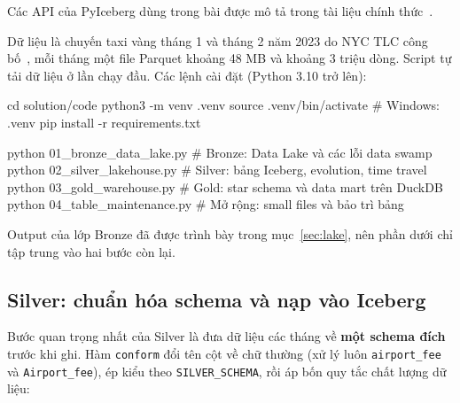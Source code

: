 \documentclass[12pt]{article}
\begin{document}
Các API của PyIceberg dùng trong bài được mô tả trong tài liệu chính thức~\cite{pyiceberg2026docs}.

Dữ liệu là chuyến taxi vàng tháng 1 và tháng 2 năm 2023 do NYC TLC công bố~\cite{tlc2026data}, mỗi tháng một file Parquet khoảng 48 MB và khoảng 3 triệu dòng. Script tự tải dữ liệu ở lần chạy đầu. Các lệnh cài đặt (Python 3.10 trở lên):

\begin{aivncodebox}
\begin{python}[language=bash]
cd solution/code
python3 -m venv .venv
source .venv/bin/activate          # Windows: .venv\Scripts\activate
pip install -r requirements.txt

python 01_bronze_data_lake.py      # Bronze: Data Lake và các lỗi data swamp
python 02_silver_lakehouse.py      # Silver: bảng Iceberg, evolution, time travel
python 03_gold_warehouse.py        # Gold: star schema và data mart trên DuckDB
python 04_table_maintenance.py     # Mở rộng: small files và bảo trì bảng
\end{python}
\end{aivncodebox}

Output của lớp Bronze đã được trình bày trong mục~\ref{sec:lake}, nên phần dưới chỉ tập trung vào hai bước còn lại.

\subsection{Silver: chuẩn hóa schema và nạp vào Iceberg}

Bước quan trọng nhất của Silver là đưa dữ liệu các tháng về \textbf{một schema đích} trước khi ghi. Hàm \texttt{conform} đổi tên cột về chữ thường (xử lý luôn \texttt{airport\_fee} và \texttt{Airport\_fee}), ép kiểu theo \texttt{SILVER\_SCHEMA}, rồi áp bốn quy tắc chất lượng dữ liệu:
\end{document}

